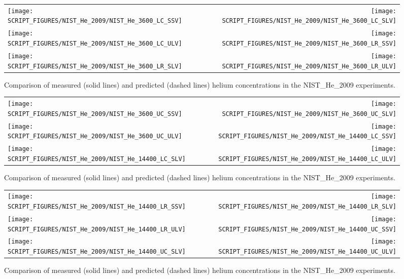 \newpage

\begin{figure}[p]
\begin{tabular*}{\textwidth}{l@{\extracolsep{\fill}}r}
\texttt{[image: SCRIPT\_FIGURES/NIST\_He\_2009/NIST\_He\_3600\_LC\_SSV]} &
\texttt{[image: SCRIPT\_FIGURES/NIST\_He\_2009/NIST\_He\_3600\_LC\_SLV]} \\
\texttt{[image: SCRIPT\_FIGURES/NIST\_He\_2009/NIST\_He\_3600\_LC\_ULV]} &
\texttt{[image: SCRIPT\_FIGURES/NIST\_He\_2009/NIST\_He\_3600\_LR\_SSV]} \\
\texttt{[image: SCRIPT\_FIGURES/NIST\_He\_2009/NIST\_He\_3600\_LR\_SLV]} &
\texttt{[image: SCRIPT\_FIGURES/NIST\_He\_2009/NIST\_He\_3600\_LR\_ULV]}
\end{tabular*}
\caption[Results of the NIST\_He\_2009 experiments]{Comparison of measured (solid lines) and predicted (dashed lines) helium concentrations in the NIST\_He\_2009 experiments.}
\label{NIST_Hydrogen_Species_1}
\end{figure}

\begin{figure}[p]
\begin{tabular*}{\textwidth}{l@{\extracolsep{\fill}}r}
\texttt{[image: SCRIPT\_FIGURES/NIST\_He\_2009/NIST\_He\_3600\_UC\_SSV]} &
\texttt{[image: SCRIPT\_FIGURES/NIST\_He\_2009/NIST\_He\_3600\_UC\_SLV]} \\
\texttt{[image: SCRIPT\_FIGURES/NIST\_He\_2009/NIST\_He\_3600\_UC\_ULV]} &
\texttt{[image: SCRIPT\_FIGURES/NIST\_He\_2009/NIST\_He\_14400\_LC\_SSV]} \\
\texttt{[image: SCRIPT\_FIGURES/NIST\_He\_2009/NIST\_He\_14400\_LC\_SLV]} &
\texttt{[image: SCRIPT\_FIGURES/NIST\_He\_2009/NIST\_He\_14400\_LC\_ULV]}
\end{tabular*}
\caption[Results of the NIST\_He\_2009 experiments]{Comparison of measured (solid lines) and predicted (dashed lines) helium concentrations in the NIST\_He\_2009 experiments.}
\label{NIST_Hydrogen_Species_2}
\end{figure}

\begin{figure}[p]
\begin{tabular*}{\textwidth}{l@{\extracolsep{\fill}}r}
\texttt{[image: SCRIPT\_FIGURES/NIST\_He\_2009/NIST\_He\_14400\_LR\_SSV]} &
\texttt{[image: SCRIPT\_FIGURES/NIST\_He\_2009/NIST\_He\_14400\_LR\_SLV]} \\
\texttt{[image: SCRIPT\_FIGURES/NIST\_He\_2009/NIST\_He\_14400\_LR\_ULV]} &
\texttt{[image: SCRIPT\_FIGURES/NIST\_He\_2009/NIST\_He\_14400\_UC\_SSV]} \\
\texttt{[image: SCRIPT\_FIGURES/NIST\_He\_2009/NIST\_He\_14400\_UC\_SLV]} &
\texttt{[image: SCRIPT\_FIGURES/NIST\_He\_2009/NIST\_He\_14400\_UC\_ULV]}
\end{tabular*}
\caption[Results of the NIST\_He\_2009 experiments]{Comparison of measured (solid lines) and predicted (dashed lines) helium concentrations in the NIST\_He\_2009 experiments.}
\label{NIST_Hydrogen_Species_3}
\end{figure}

